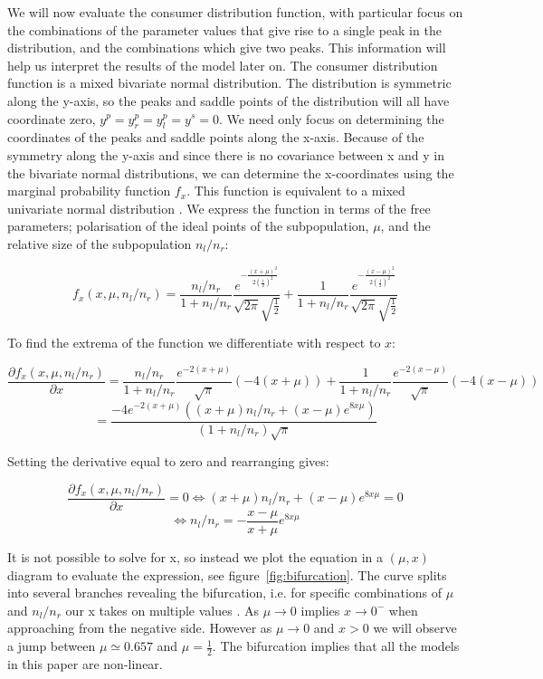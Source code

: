 \documentclass[preprint, 12pt]{elsarticle}
\begin{document}
We will now evaluate the consumer distribution function, with particular focus on the combinations of the parameter values that give rise to a single peak in the distribution, and the combinations which give two peaks. This information will help us interpret the results of the model later on. The consumer distribution function is a mixed bivariate normal distribution. The distribution is symmetric along the y-axis, so the peaks and saddle points of the distribution will all have coordinate zero, $y^p = y^p_r = y^p_l = y^s =0$. We need only focus on determining the coordinates of the peaks and saddle points along the x-axis. Because of the symmetry along the y-axis and since there is no covariance between x and y in the bivariate normal distributions, we can determine the x-coordinates using the marginal probability function $f_x$. This function is equivalent to a mixed univariate normal distribution \citep{Weisstein_2002a, Weisstein_2002b, Balakrishnan_Lai_2009}. We express the function in terms of the free parameters; polarisation of the ideal points of the subpopulation, $\mu$, and the relative size of the subpopulation $n_l/n_r$:

\[
f_x(x,\mu,n_l/n_r) = \frac{n_l/n_r}{1+n_l/n_r} \frac{ e^{-\frac{(x+\mu)^2}{2\left(\frac{1}{2}\right)^2}}}{\sqrt{2\pi}\sqrt{\frac{1}{2}}} + \frac{1}{1+n_l/n_r} \frac{ e^{-\frac{(x-\mu)^2}{2\left(\frac{1}{2}\right)^2}}}{\sqrt{2\pi}\sqrt{\frac{1}{2}}}
\]

To find the extrema of the function we differentiate with respect to $x$:

\[
\frac{\partial f_x(x,\mu,n_l/n_r)}{{\partial x}} = \frac{n_l/n_r}{1+n_l/n_r} \frac{ e^{-2(x+\mu)}}{\sqrt{\pi}}\left(-4(x+\mu)\right) + \frac{1}{1+n_l/n_r} \frac{ e^{-2(x-\mu)}}{\sqrt{\pi}}\left(-4(x-\mu)\right)
\]
\[
= \frac{-4e^{-2(x+\mu)} \left((x+\mu)n_l/n_r + (x-\mu)e^{8x\mu} \right) }{(1+n_l/n_r)\sqrt{\pi}}
\]

Setting the derivative equal to zero and rearranging gives:

\[
\frac{\partial f_x(x,\mu,n_l/n_r)}{{\partial x}} = 0 \Leftrightarrow (x+\mu)n_l/n_r + (x-\mu)e^{8x\mu} = 0
\]
\begin{equation}
\Leftrightarrow n_l/n_r = - \frac{x-\mu}{x+\mu} e^{8x\mu}
\label{eq:extrema}
\end{equation}

It is not possible to solve for x, so instead we plot the equation in a $(\mu, x)$ diagram to evaluate the expression, see figure~\ref{fig:bifurcation}. The curve splits into several branches revealing the bifurcation, i.e. for specific combinations of $\mu$ and $n_l/n_r$ our x takes on multiple values \citep{Strogatz_1994}. As $\mu \to 0$ implies $x \to 0^-$ when approaching from the negative side. However as $\mu \to 0$ and $x > 0$ we will observe a jump between $\mu \simeq 0.657$ and $\mu = \frac{1}{2}$. The bifurcation implies that all the models in this paper are non-linear.
\end{document}
